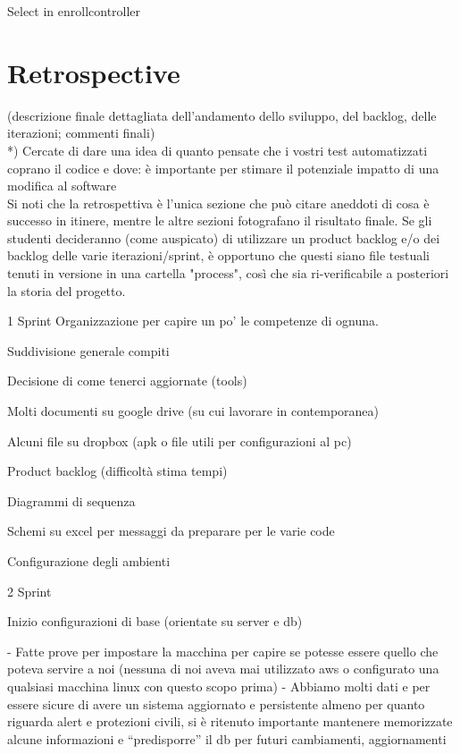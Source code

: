 \documentclass[a4paper,12pt]{report}
\begin{document}
Select in enrollcontroller


\chapter{Retrospective}

(descrizione finale dettagliata dell'andamento dello sviluppo, del backlog, delle iterazioni; commenti finali)\\

*) Cercate di dare una idea di quanto pensate che i vostri test automatizzati coprano il codice e dove: è importante per stimare il potenziale impatto di una modifica al software\\


Si noti che la retrospettiva è l'unica sezione che può citare aneddoti di cosa è successo in itinere, mentre le altre sezioni fotografano il risultato finale. Se gli studenti decideranno (come auspicato) di utilizzare un product backlog e/o dei backlog delle varie iterazioni/sprint, è opportuno che questi siano file testuali tenuti in versione in una cartella "process", così che sia ri-verificabile a posteriori la storia del progetto.

1 Sprint
Organizzazione per capire un po’ le competenze di ognuna.

Suddivisione generale compiti 

Decisione di come tenerci aggiornate (tools)

Molti documenti su google drive (su cui lavorare in contemporanea)

Alcuni file su dropbox (apk o file utili per configurazioni al pc)

Product backlog (difficoltà stima tempi)

Diagrammi di sequenza 

Schemi su excel per messaggi da preparare per le varie code

Configurazione degli ambienti

2 Sprint 

Inizio configurazioni di base (orientate su server e db) 


-	Fatte prove per impostare la macchina per capire se potesse essere quello che poteva servire a noi (nessuna di noi aveva mai utilizzato aws o configurato una qualsiasi macchina linux con questo scopo prima)
-	Abbiamo molti dati e per essere sicure di avere un sistema aggiornato e persistente almeno per quanto riguarda alert e protezioni civili, si è ritenuto importante mantenere memorizzate alcune informazioni e “predisporre” il db per futuri cambiamenti, aggiornamenti
\end{document}
